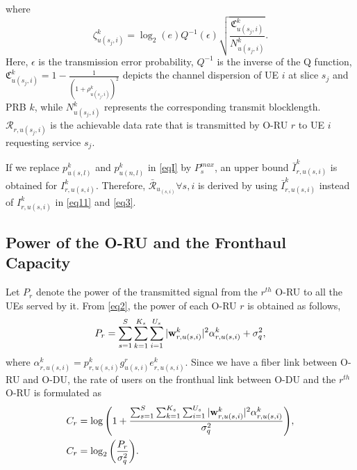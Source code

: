 \documentclass[lettersize,journal]{IEEEtran}
\begin{document}
where %
\begin{equation}\label{shortPacket}
 \zeta_{u(s_j,i)}^{k} = \log_2({e})Q^{-1}(\epsilon) \sqrt{\frac{\mathfrak{C}_{u(s_j,i)}^{k}}{N_{u(s_j,i)}^{k}}}.
\end{equation}
Here, $\epsilon$ is the transmission error probability, $Q^{-1}$ is the inverse of the Q function,
$\mathfrak{C}_{u(s_j,i)}^{k} = 1 - \frac{1}{(1+\rho_{u(s_j,i)}^{k})^2}$ depicts the channel dispersion of UE  $i$ at slice $s_j$ and PRB $k$, while
$N_{u(s_j,i)}^{k}$ represents the corresponding transmit blocklength.
$\mathcal{R}_{r,u(s_j,i)}$ is the achievable data rate that is transmitted by O-RU $r$ to UE $i$ requesting service $s_j$.

If we replace $p_{u(s,l)}^{k}$ and $p_{u(n,l)}^{k}$ in \eqref{eqI} by $P_{s}^{max}$, an upper bound $\bar{I}_{r,u(s,i)}^{k}$ is obtained for $I_{r,u(s,i)}^{k}$. Therefore, $\bar{\mathcal{R}}_{u_{(s,i)}} \forall s , i$ is derived by using $\bar{I}_{r,u(s,i)}^{k}$ instead of $I_{r,u(s,i)}^{k}$ in  \eqref{eq11} and \eqref{eq3}.
\subsection{Power of the O-RU and the Fronthaul Capacity}
Let $P_r$ denote the power of the transmitted signal from the $r^{th}$ O-RU to all the UEs served by it. From \eqref{eq2}, the power of each O-RU $r$ is obtained as follows,
\begin{equation}\label{pr}
P_r = \sum_{s=1}^{S}\sum_{k=1}^{K_s}\sum_{i=1}^{U_s}|\bold{w}_{r,u(s,i)}^{k}|^2\alpha^k_{r,u(s,i)} + \sigma_{q}^2,
\end{equation}
where $\alpha^k_{r,u(s,i)}= p_{r,u(s,i)}^{k} g_{u(s,i)}^r e^k_{r,u(s,i)}$.
Since we have a fiber link between O-RU and O-DU, the rate of users on the fronthual link between O-DU and the $r^{th}$ O-RU  is formulated as
\begin{align}\label{cr}
C_{r} &= \log{\left(1+ \frac{\sum_{s=1}^{S}\sum_{k=1}^{K_s}\sum_{i=1}^{U_s}|\bold{w}_{r,u(s,i)}^{k}|^2 \mathcal{\alpha}^k_{r,u(s,i)} }{ \sigma_{q}^2}\right)},\nonumber\\
C_{r} &= \log_2{\left(\frac{P_r}{ \sigma_{q}^2}\right)}.
\end{align}
\end{document}
